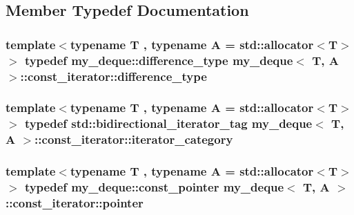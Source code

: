 \subsection{Member Typedef Documentation}
\hypertarget{classmy__deque_1_1const__iterator_abe3b655aa980c8a12ba486058464c91d}{
\subsubsection[{difference\-\_\-type}]{\setlength{\rightskip}{0pt plus 5cm}template$<$typename T , typename A  = std\-::allocator$<$\-T$>$$>$ typedef {\bf my\-\_\-deque\-::difference\-\_\-type} {\bf my\-\_\-deque}$<$ T, A $>$\-::{\bf const\-\_\-iterator\-::difference\-\_\-type}}}\label{classmy__deque_1_1const__iterator_abe3b655aa980c8a12ba486058464c91d}
\hypertarget{classmy__deque_1_1const__iterator_a1a84b424e091e49a4af1c13a38621252}{
\subsubsection[{iterator\-\_\-category}]{\setlength{\rightskip}{0pt plus 5cm}template$<$typename T , typename A  = std\-::allocator$<$\-T$>$$>$ typedef std\-::bidirectional\-\_\-iterator\-\_\-tag {\bf my\-\_\-deque}$<$ T, A $>$\-::{\bf const\-\_\-iterator\-::iterator\-\_\-category}}}\label{classmy__deque_1_1const__iterator_a1a84b424e091e49a4af1c13a38621252}
\hypertarget{classmy__deque_1_1const__iterator_a6a7d42610f3b7e55f38897c151862071}{
\subsubsection[{pointer}]{\setlength{\rightskip}{0pt plus 5cm}template$<$typename T , typename A  = std\-::allocator$<$\-T$>$$>$ typedef {\bf my\-\_\-deque\-::const\-\_\-pointer} {\bf my\-\_\-deque}$<$ T, A $>$\-::{\bf const\-\_\-iterator\-::pointer}}}\label{classmy__deque_1_1const__iterator_a6a7d42610f3b7e55f38897c151862071}
